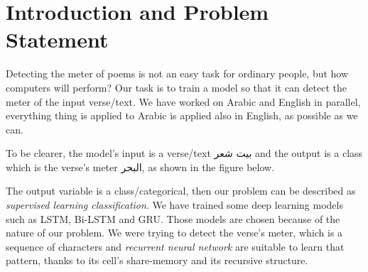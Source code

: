 \documentclass[12pt]{report}
\begin{document}






\section*{Introduction and Problem Statement}
Detecting the meter of poems is not an easy task for ordinary people, but how
computers will perform? Our task is to train a model so that it can detect the
meter of the input verse/text.
We have worked on Arabic and English in parallel, everything thing is applied to
Arabic is applied also in English, as possible as we can.

To be clearer, the model's input is a verse/text \textarabic{بيت شعر} and the
output is a class which is the verse's meter \textarabic{البحر}, as shown in the
figure below.


\begin{center}
\end{center}

The output variable is a class/categorical, then our problem can be described as
\textit{supervised learning  classification}.  We have trained some deep learning
models such as LSTM, Bi-LSTM and GRU.  Those models are chosen because of the
nature of our problem. We were trying to detect the verse's meter, which is a
sequence of characters and \textit{recurrent neural network} are suitable  to
learn that pattern, thanks to its cell's share-memory and its recursive
structure.
\end{document}
